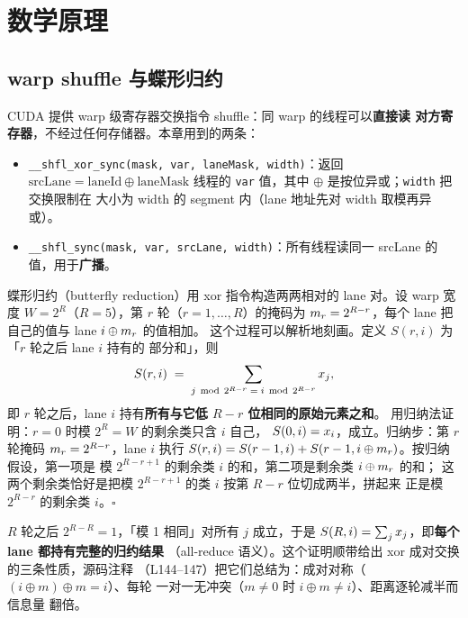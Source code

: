 \section{数学原理}\label{sec:ch02-math}

\subsection{warp shuffle 与蝶形归约}

CUDA 提供 warp 级寄存器交换指令 shuffle：同 warp 的线程可以\textbf{直接读
对方寄存器}，不经过任何存储器。本章用到的两条：

\begin{itemize}
\item \texttt{\_\allowbreak{}\_\allowbreak{}shfl\_\allowbreak{}xor\_\allowbreak{}sync\allowbreak{}(mask,\allowbreak{} var,\allowbreak{} lane\allowbreak{}Mask,\allowbreak{} width)}：返回
  $\mathrm{srcLane} = \mathrm{laneId} \oplus \mathrm{laneMask}$ 线程的
  \texttt{var} 值，其中 $\oplus$ 是按位异或；\texttt{width} 把交换限制在
  大小为 width 的 segment 内（lane 地址先对 width 取模再异或）。
\item \texttt{\_\allowbreak{}\_\allowbreak{}shfl\_\allowbreak{}sync\allowbreak{}(mask,\allowbreak{} var,\allowbreak{} src\allowbreak{}Lane,\allowbreak{} width)}：所有线程读同一
  srcLane 的值，用于\textbf{广播}。
\end{itemize}

蝶形归约（butterfly reduction）用 xor 指令构造两两相对的 lane 对。设 warp
宽度 $W = 2^{R}$（$R = 5$），第 $r$ 轮（$r = 1, \dots, R$）的掩码为
$m\sb r = 2^{R-r}$，每个 lane 把自己的值与 lane $i \oplus m\sb r$ 的值相加。
这个过程可以解析地刻画。定义 $S(r, i)$ 为「$r$ 轮之后 lane $i$ 持有的
部分和」，则
\begin{equation}
  S(r, i) \;=\; \sum\sb{j \,\bmod\, 2^{R-r} \;=\; i \,\bmod\, 2^{R-r}} x\sb j,
  \label{eq:ch02-invariant}
\end{equation}
即 $r$ 轮之后，lane $i$ 持有\textbf{所有与它低 $R-r$ 位相同的原始元素之和}。
用归纳法证明：$r = 0$ 时模 $2^{R} = W$ 的剩余类只含 $i$ 自己，
$S(0, i) = x\sb i$，成立。归纳步：第 $r$ 轮掩码 $m\sb r = 2^{R-r}$，lane $i$
执行 $S(r, i) = S(r-1, i) + S(r-1, i \oplus m\sb r)$。按归纳假设，第一项是
模 $2^{R-r+1}$ 的剩余类 $i$ 的和，第二项是剩余类 $i \oplus m\sb r$ 的和；
这两个剩余类恰好是把模 $2^{R-r+1}$ 的类 $i$ 按第 $R-r$ 位切成两半，拼起来
正是模 $2^{R-r}$ 的剩余类 $i$。$\square$

$R$ 轮之后 $2^{R-R} = 1$，「模 1 相同」对所有 $j$ 成立，于是
$S(R, i) = \sum\sb j x\sb j$，即\textbf{每个 lane 都持有完整的归约结果}
（all-reduce 语义）。这个证明顺带给出 xor 成对交换的三条性质，源码注释
（L144--147）把它们总结为：成对对称（$(i \oplus m) \oplus m = i$）、每轮
一对一无冲突（$m \neq 0$ 时 $i \oplus m \neq i$）、距离逐轮减半而信息量
翻倍。

